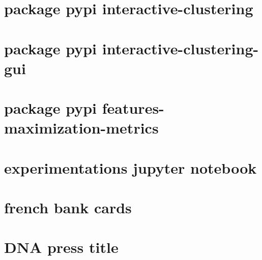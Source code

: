 \label{annex:B-ANNEXE-TECHNIQUE}

	\minitoc

    \section{package pypi interactive-clustering}
    \section{package pypi interactive-clustering-gui}
    \section{package pypi features-maximization-metrics}
    \section{experimentations jupyter notebook}

\label{annex:C-ANNEXE-DATASET}

	\minitoc

    \section{french bank cards}
    \section{DNA press title}